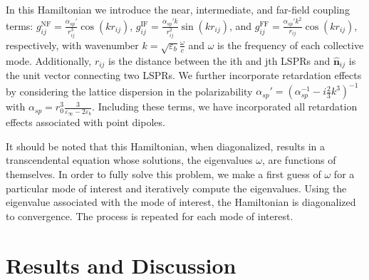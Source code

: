 \documentclass[journal=apchd5,manuscript=article]{achemso}
\begin{document}
In this Hamiltonian we introduce the near, intermediate, and far-field coupling terms: $g_{ij}^{\textrm{NF}} = \frac{\alpha_{sp}'}{r_{ij}^3}\cos\left(k r_{ij}\right)$, $g_{ij}^{\textrm{IF}} = \frac{\alpha_{sp}'k}{r_{ij}^2}\sin\left(k r_{ij}\right)$, and $g_{ij}^{\textrm{FF}} = \frac{\alpha_{sp}'k^2}{r_{ij}}\cos\left(k r_{ij}\right)$, respectively, with wavenumber $k = \sqrt{\varepsilon_b}\frac{\omega}{c}$ and $\omega$ is the frequency of each collective mode. Additionally, $r_{ij}$ is the distance between the ith and jth LSPRs and $\hat{\textbf{n}}_{ij}$ is the unit vector connecting two LSPRs. We further incorporate retardation effects by considering the lattice dispersion in the polarizability $\alpha_{sp}' = \left(\alpha_{sp}^{-1} - i\frac{2}{3}k^3\right)^{-1}$ with $\alpha_{sp} = r_0^3\frac{3}{\varepsilon_{\infty}-2\varepsilon_b}$. Including these terms, we have incorporated all retardation effects associated with point dipoles\cite{Purcell1973,Draine1993}.

It should be noted that this Hamiltonian, when diagonalized, results in a transcendental equation whose solutions, the eigenvalues $\omega$, are functions of themselves. In order to fully solve this problem, we make a first guess of $\omega$ for a particular mode of interest and iteratively compute the eigenvalues. Using the eigenvalue associated with the mode of interest, the Hamiltonian is diagonalized to convergence. The process is repeated for each mode of interest.

\section{Results and Discussion}
\end{document}
